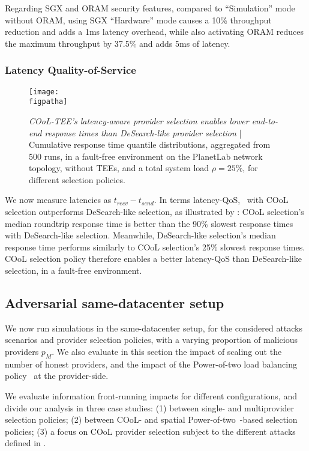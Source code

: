 Regarding SGX and ORAM security features, compared to ``Simulation'' mode without ORAM, using SGX ``Hardware'' mode causes a 10\% throughput reduction and adds a 1ms latency overhead, while also activating ORAM reduces the maximum throughput by 37.5\% and adds 5ms of latency. 

\subsubsection{Latency Quality-of-Service}\label{ssec:res-lqos}

\begin{figure}
    \centering
    \texttt{[image: \\figpatha]}
    \caption{\emph{COoL-TEE's latency-aware provider selection enables lower end-to-end response times than DeSearch-like provider selection} | Cumulative response time quantile distributions, aggregated from 500 runs, in a fault-free environment on the PlanetLab network topology, without TEEs, and a total system load $\rho=25\%$, for different selection policies.}
    \label{fig:ff-woTEE-PLlats}
\end{figure}

We now measure latencies as $t_{recv}-t_{send}$. 
In terms latency-QoS, \sysname~with COoL selection outperforms DeSearch-like selection, as illustrated by : 
COoL selection's median roundtrip response time is better than the 90\% slowest response times with DeSearch-like selection.
Meanwhile, DeSearch-like selection's median response time performs similarly to COoL selection's 25\% slowest response times.
COoL selection policy therefore enables a better latency-QoS than DeSearch-like selection, in a fault-free environment.

\subsection{Adversarial same-datacenter setup}\label{ssec:res-sameDC}

We now run simulations in the same-datacenter setup, for the considered attacks scenarios and provider selection policies, with a varying proportion of malicious providers $p_{M}$.
We also evaluate in this section the impact of scaling out the number of honest providers, and the impact of the Power-of-two load balancing policy~\cite{mitzenmacherPowerTwoChoices2001} at the provider-side.

We evaluate information front-running impacts for different configurations, and divide our analysis in three case studies:
(1) between single- and multiprovider selection policies;
(2) between COoL- and spatial Power-of-two~\cite{panigrahyAnalysisEvaluationProximitybased2022}-based selection policies;
(3) a focus on COoL provider selection subject to the different attacks defined in .

